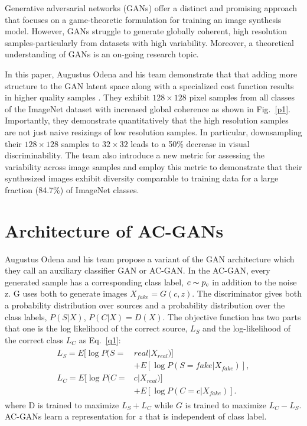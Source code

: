\documentclass[10pt,twocolumn,letterpaper]{article}
\begin{document}
Generative adversarial networks (GANs) offer a distinct and promising approach that focuses on a game-theoretic formulation for training an image synthesis model. However, GANs struggle to generate globally coherent, high resolution samples-particularly from datasets with high variability. Moreover, a theoretical understanding of GANs is an on-going research topic.

In this paper, Augustus Odena and his team demonstrate that that adding more structure to the GAN latent space along with a specialized cost function results in higher quality samples \cite{Odena2016Conditional}. They exhibit $128\times 128$ pixel samples from all classes of the ImageNet dataset \cite{Russakovsky2015ImageNet} with increased global coherence as shown in Fig.~\ref{p1}. Importantly, they demonstrate quantitatively that the high resolution samples are not just naive resizings of low resolution samples. In particular, downsampling their $128\times 128$ samples to $32\times 32$ leads to a 50\% decrease in visual discriminability. The team also introduce a new metric for assessing the variability across image samples and employ this metric to demonstrate that their synthesized images exhibit diversity comparable to training data for a large fraction (84.7\%) of ImageNet classes.

\section{Architecture of AC-GANs}

Augustus Odena and his team propose a variant of the GAN architecture which they call an auxiliary classifier GAN or AC-GAN. In the AC-GAN, every generated sample has a corresponding class label, $c\thicksim p_c$ in addition to the noise z. G uses both to generate images $X_{fake} = G(c,z)$. The discriminator gives both a probability distribution over sources and a probability distribution over the class labels, $P(S|X)$, $P(C|X)=D(X)$. The objective function has two parts that one is the log likelihood of the correct source, $L_S$  and the log-likelihood of the correct class $L_C$ as Eq.~\ref{q1}:
\begin{equation}
\begin{aligned}
\begin{split}
L_S=E[\log P(S=&real |X_{real})]\\
&+E[\log P(S=fake |X_{fake})], \\
L_C=E[\log P(C=&c |X_{real})]\\
&+E[\log P(C=c |X_{fake})].
\label{q1}
\end{split}
\end{aligned}
\end{equation}
where D is trained to maximize $L_S + L_C$ while $G$ is trained to maximize $L_C - L_S$. AC-GANs learn a representation for $z$ that is independent of class label.
\end{document}
